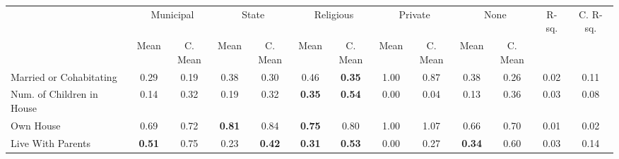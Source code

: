 \begin{tabular}{l c c c c c c c c c c c c}
\toprule
& \multicolumn{2}{c}{Municipal} & \multicolumn{2}{c}{State} & \multicolumn{2}{c}{Religious} & \multicolumn{2}{c}{Private} & \multicolumn{2}{c}{None} & R-sq. & C. R-sq. \\
& \scriptsize Mean & \scriptsize C. Mean & \scriptsize Mean & \scriptsize C. Mean & \scriptsize Mean & \scriptsize C. Mean & \scriptsize Mean & \scriptsize C. Mean & \scriptsize Mean & \scriptsize C. Mean & & \\
\midrule
Married or Cohabitating &      0.29 & 0.19 &      0.38 & 0.30 &      0.46 & \textbf{     0.35} &      1.00 & 0.87 &      0.38 & 0.26 &      0.02 &      0.11 \\
Num. of Children in House &      0.14 & 0.32 &      0.19 & 0.32 & \textbf{     0.35} & \textbf{     0.54} &      0.00 & 0.04 &      0.13 & 0.36 &      0.03 &      0.08 \\
Own House &      0.69 & 0.72 & \textbf{     0.81} & 0.84 & \textbf{     0.75} & 0.80 &      1.00 & 1.07 &      0.66 & 0.70 &      0.01 &      0.02 \\
Live With Parents & \textbf{     0.51} & 0.75 &      0.23 & \textbf{     0.42} & \textbf{     0.31} & \textbf{     0.53} &      0.00 & 0.27 & \textbf{     0.34} & 0.60 &      0.03 &      0.14 \\
\bottomrule
\end{tabular}
